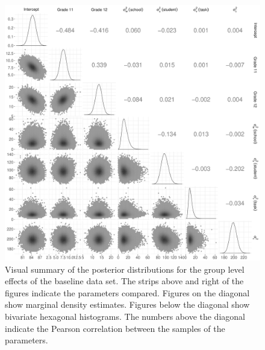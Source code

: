 \documentclass[a4paper]{article}
\begin{document}
\begin{figure}[!ht]
	\includegraphics[width=\textwidth]{figures/baselinePosteriorDescriptivesPlot.pdf}
	\caption{Visual summary of the posterior distributions for the group level effects of the baseline data set. The strips above and right of the figures indicate the parameters compared. Figures on the diagonal show marginal density estimates. Figures below the diagonal show bivariate hexagonal histograms. The numbers above the diagonal indicate the Pearson correlation between the samples of the parameters.}
	\label{fig:baselinePosteriorDescriptives}
\end{figure}

%
\end{document}
